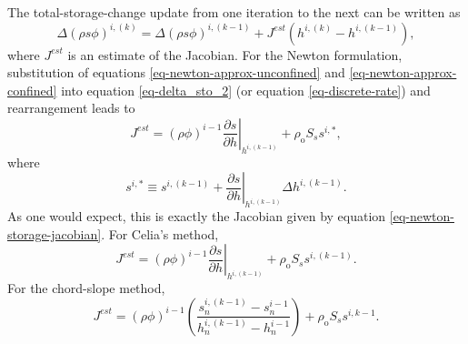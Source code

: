 \documentclass[fleqn]{article}
\begin{document}
The total-storage-change update from one iteration to the next can be written as
\begin{equation}
  \Delta \left ( \rho s \phi \right )^{i,(k)} = \Delta \left ( \rho s \phi \right )^{i,(k-1)} +
  J^{est} \left ( h^{i,(k)} - h^{i,(k-1)} \right ) ,
  \label{eq-delta_sto_update}
\end{equation}
where $J^{est}$ is an estimate of the Jacobian. For the Newton formulation, substitution of equations \ref{eq-newton-approx-unconfined} and \ref{eq-newton-approx-confined} into equation \ref{eq-delta_sto_2} (or equation \ref{eq-discrete-rate}) and rearrangement leads to
\begin{equation}
  J^{est} = (\rho \phi)^{i-1} \left. \frac{\partial s}{\partial h}\right|_{h^{i,(k-1)}} +
  \rho_{\textrm{o}} S_s s^{i,*} ,
  \label{eq-jest-newton}
\end{equation}
where
\begin{equation}
  s^{i,*} \equiv  s^{i,(k-1)} + \left. \frac{\partial s}{\partial h}\right|_{h^{i,(k-1)}}
  \Delta h^{i,(k-1)} .
\end{equation}
As one would expect, this is exactly the Jacobian given by equation \ref{eq-newton-storage-jacobian}. For Celia's method,
\begin{equation}
  J^{est} = (\rho \phi)^{i-1} \left. \frac{\partial s}{\partial h}\right|_{h^{i,(k-1)}} +
  \rho_{\textrm{o}} S_s s^{i,(k-1)} .
  \label{eq-jest-celia}
\end{equation}
For the chord-slope method,
\begin{equation}
  J^{est} = (\rho \phi)^{i-1}
  \left( \frac{s_n^{i,(k-1)} - s_n^{i-1}}{h_n^{i,(k-1)} - h_n^{i-1}} \right) +
  \rho_{\textrm{o}} S_s s^{i,k-1} .
  \label{eq-jest-chord-slope}
\end{equation}



\end{document}
